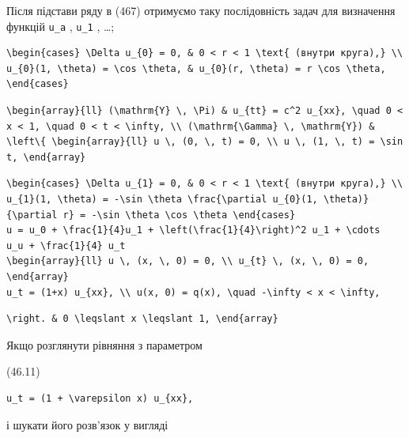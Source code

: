 \documentclass[
  ukrainian,
]{article}
\begin{document}
Після підстави ряду в (467) отримуємо таку послідовність задач для
визначення функцій \texttt{u\_a} , \texttt{u\_1} , \ldots;

\begin{verbatim}
\begin{cases} \Delta u_{0} = 0, & 0 < r < 1 \text{ (внутри круга),} \\ u_{0}(1, \theta) = \cos \theta, & u_{0}(r, \theta) = r \cos \theta, \end{cases}
\end{verbatim}

\begin{verbatim}
\begin{array}{ll} (\mathrm{Y} \, \Pi) & u_{tt} = c^2 u_{xx}, \quad 0 < x < 1, \quad 0 < t < \infty, \\ (\mathrm{\Gamma} \, \mathrm{Y}) & \left\{ \begin{array}{ll} u \, (0, \, t) = 0, \\ u \, (1, \, t) = \sin t, \end{array}
\end{verbatim}

\begin{verbatim}
\begin{cases} \Delta u_{1} = 0, & 0 < r < 1 \text{ (внутри круга),} \\ u_{1}(1, \theta) = -\sin \theta \frac{\partial u_{0}(1, \theta)}{\partial r} = -\sin \theta \cos \theta \end{cases}
u = u_0 + \frac{1}{4}u_1 + \left(\frac{1}{4}\right)^2 u_1 + \cdots
u_u + \frac{1}{4} u_t
\begin{array}{ll} u \, (x, \, 0) = 0, \\ u_{t} \, (x, \, 0) = 0, \end{array}
u_t = (1+x) u_{xx}, \\ u(x, 0) = q(x), \quad -\infty < x < \infty,
\end{verbatim}

\begin{verbatim}
\right. & 0 \leqslant x \leqslant 1, \end{array}
\end{verbatim}

Якщо розглянути рівняння з параметром

(46.11)

\begin{verbatim}
u_t = (1 + \varepsilon x) u_{xx},
\end{verbatim}

і шукати його розв'язок у вигляді
\end{document}
